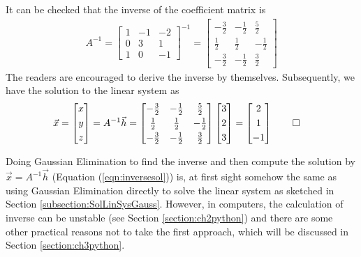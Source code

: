 \begin{solution}
It can be checked that the inverse of the coefficient matrix is
\begin{align*}
A^{-1} =
\begin{bmatrix}
1 & -1 & -2 \\[3pt]
0 & 3 & 1 \\[3pt]
1 & 0 & -1
\end{bmatrix}^{-1}   
=
\begin{bmatrix}
-\frac{3}{2} & -\frac{1}{2} & \frac{5}{2} \\[3pt]
\frac{1}{2} & \frac{1}{2} & -\frac{1}{2} \\[3pt]
-\frac{3}{2} & -\frac{1}{2} & \frac{3}{2}
\end{bmatrix}
\end{align*}
The readers are encouraged to derive the inverse by themselves. Subsequently, we have the solution to the linear system as
\begin{align*}
\vec{x} = 
\begin{bmatrix}
x \\[3pt]
y \\[3pt]
z
\end{bmatrix}
&= A^{-1}\vec{h} =  
\begin{bmatrix}
-\frac{3}{2} & -\frac{1}{2} & \frac{5}{2} \\[3pt]
\frac{1}{2} & \frac{1}{2} & -\frac{1}{2} \\[3pt]
-\frac{3}{2} & -\frac{1}{2} & \frac{3}{2}
\end{bmatrix}
\begin{bmatrix}
3 \\[3pt]
2 \\[3pt]
3
\end{bmatrix}
=
\begin{bmatrix}
2 \\[3pt]
1 \\[3pt]
-1
\end{bmatrix} \qedhere
\end{align*}
\end{solution}
Doing Gaussian Elimination to find the inverse and then compute the solution by $\vec{x} = A^{-1}\vec{h}$ (Equation (\ref{eqn:inversesol})) is, at first sight somehow the same as using Gaussian Elimination directly to solve the linear system as sketched in Section \ref{subsection:SolLinSysGauss}. However, in computers, the calculation of inverse can be unstable (see Section \ref{section:ch2python}) and there are some other practical reasons not to take the first approach, which will be discussed in Section \ref{section:ch3python}. \par
